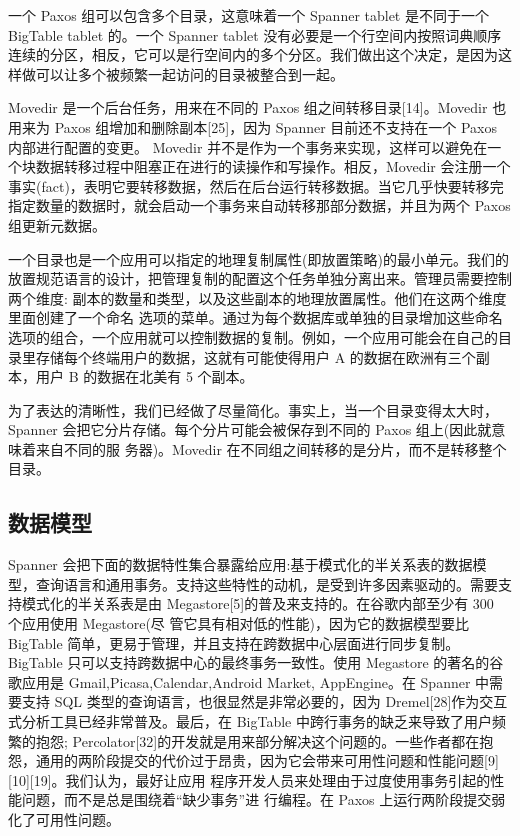 \documentclass[letterpaper,twocolumn,10pt]{article}
\begin{document}
一个 Paxos 组可以包含多个目录，这意味着一个 Spanner tablet 是不同于一个 BigTable tablet 的。一个 Spanner tablet 没有必要是一个行空间内按照词典顺序连续的分区，相反，它可以是行空间内的多个分区。我们做出这个决定，是因为这样做可以让多个被频繁一起访问的目录被整合到一起。

Movedir 是一个后台任务，用来在不同的 Paxos 组之间转移目录[14]。Movedir 也用来为 Paxos 组增加和删除副本[25]，因为 Spanner 目前还不支持在一个 Paxos 内部进行配置的变更。 Movedir 并不是作为一个事务来实现，这样可以避免在一个块数据转移过程中阻塞正在进行的读操作和写操作。相反，Movedir 会注册一个事实(fact)，表明它要转移数据，然后在后台运行转移数据。当它几乎快要转移完指定数量的数据时，就会启动一个事务来自动转移那部分数据，并且为两个 Paxos 组更新元数据。

一个目录也是一个应用可以指定的地理复制属性(即放置策略)的最小单元。我们的放置规范语言的设计，把管理复制的配置这个任务单独分离出来。管理员需要控制两个维度: 副本的数量和类型，以及这些副本的地理放置属性。他们在这两个维度里面创建了一个命名 选项的菜单。通过为每个数据库或单独的目录增加这些命名选项的组合，一个应用就可以控制数据的复制。例如，一个应用可能会在自己的目录里存储每个终端用户的数据，这就有可能使得用户 A 的数据在欧洲有三个副本，用户 B 的数据在北美有 5 个副本。

为了表达的清晰性，我们已经做了尽量简化。事实上，当一个目录变得太大时，Spanner 会把它分片存储。每个分片可能会被保存到不同的 Paxos 组上(因此就意味着来自不同的服 务器)。Movedir 在不同组之间转移的是分片，而不是转移整个目录。

\subsection{数据模型}
Spanner 会把下面的数据特性集合暴露给应用:基于模式化的半关系表的数据模型，查询语言和通用事务。支持这些特性的动机，是受到许多因素驱动的。需要支持模式化的半关系表是由 Megastore[5]的普及来支持的。在谷歌内部至少有 300 个应用使用 Megastore(尽 管它具有相对低的性能)，因为它的数据模型要比 BigTable 简单，更易于管理，并且支持在跨数据中心层面进行同步复制。BigTable 只可以支持跨数据中心的最终事务一致性。使用 Megastore 的著名的谷歌应用是 Gmail,Picasa,Calendar,Android Market, AppEngine。在 Spanner 中需要支持 SQL 类型的查询语言，也很显然是非常必要的，因为 Dremel[28]作为交互式分析工具已经非常普及。最后，在 BigTable 中跨行事务的缺乏来导致了用户频繁的抱怨; Percolator[32]的开发就是用来部分解决这个问题的。一些作者都在抱怨，通用的两阶段提交的代价过于昂贵，因为它会带来可用性问题和性能问题[9][10][19]。我们认为，最好让应用 程序开发人员来处理由于过度使用事务引起的性能问题，而不是总是围绕着“缺少事务”进 行编程。在 Paxos 上运行两阶段提交弱化了可用性问题。
\end{document}
